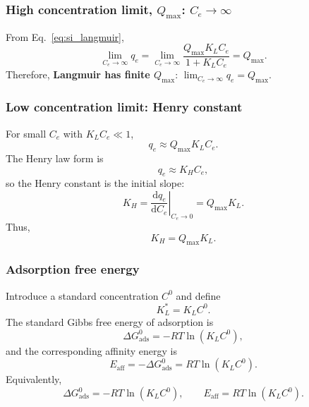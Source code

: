 \documentclass[journal=aamick,manuscript=article]{achemso}
\begin{document}
\subsubsection{High concentration limit, \(Q_{\max}\): \(C_e \to \infty\)}

From Eq.~\eqref{eq:si_langmuir},
\begin{equation}
	\lim_{C_e \to \infty} q_e
	= \lim_{C_e \to \infty}
	\frac{Q_{\max} K_L C_e}{1 + K_L C_e}
	= Q_{\max}.
\end{equation}
Therefore,
\textbf{Langmuir has finite $Q_{\max}$}:\quad
$\displaystyle \lim_{C_e \to \infty} q_e = Q_{\max}$.%

\subsubsection{Low concentration limit: Henry constant}

For small \(C_e\) with \(K_L C_e \ll 1\),
\begin{equation}
	q_e \approx Q_{\max} K_L C_e.
\end{equation}
The Henry law form is
\begin{equation}
	q_e \approx K_H C_e,
	\label{eq:si_henry}
\end{equation}
so the Henry constant is the initial slope:
\begin{equation}
	K_H = \left.\frac{\mathrm{d}q_e}{\mathrm{d}C_e}\right|_{C_e \to 0}
	= Q_{\max} K_L.
\end{equation}
Thus,
\begin{equation}
	\boxed{K_H = Q_{\max} K_L.}
\end{equation}

\subsubsection{Adsorption free energy}

Introduce a standard concentration \(C^0\) and define
\begin{equation}
	K_L^{\ast} = K_L C^0.
\end{equation}
The standard Gibbs free energy of adsorption is
\begin{equation}
	\Delta G_{\mathrm{ads}}^{0}
	= - R T \ln\left( K_L C^0 \right),
\end{equation}
and the corresponding affinity energy is
\begin{equation}
	E_{\mathrm{aff}} = - \Delta G_{\mathrm{ads}}^{0}
	= R T \ln\left( K_L C^0 \right).
\end{equation}
Equivalently,
\begin{equation}
	\boxed{
		\Delta G_{\mathrm{ads}}^{0}
		= - R T \ln\left( K_L C^0 \right),
		\qquad
		E_{\mathrm{aff}} = R T \ln\left( K_L C^0 \right).
	}
\end{equation}
\end{document}
